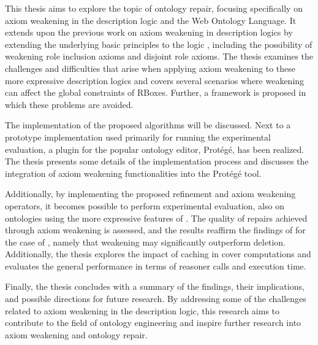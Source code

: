 This thesis aims to explore the topic of ontology repair, focusing specifically on axiom weakening in the \SROIQ description logic and the Web Ontology Language. It extends upon the previous work on axiom weakening in description logics by extending the underlying basic principles to the logic \SROIQ, including the possibility of weakening role inclusion axioms and disjoint role axioms. The thesis examines the challenges and difficulties that arise when applying axiom weakening to these more expressive description logics and covers several scenarios where weakening can affect the global constraints of \SROIQ RBoxes. Further, a framework is proposed in which these problems are avoided.

The implementation of the proposed algorithms will be discussed. Next to a prototype implementation used primarily for running the experimental evaluation, a plugin for the popular ontology editor, Protégé, has been realized. The thesis presents some details of the implementation process and discusses the integration of axiom weakening functionalities into the Protégé tool.

Additionally, by implementing the proposed refinement and axiom weakening operators, it becomes possible to perform experimental evaluation, also on ontologies using the more expressive features of \SROIQ. The quality of repairs achieved through axiom weakening is assessed, and the results reaffirm the findings of \cite{troquard2018repairing} for the case of \SROIQ, namely that weakening may significantly outperform deletion. Additionally, the thesis explores the impact of caching in cover computations and evaluates the general performance in terms of reasoner calls and execution time.

Finally, the thesis concludes with a summary of the findings, their implications, and possible directions for future research. By addressing some of the challenges related to axiom weakening in the \SROIQ description logic, this research aims to contribute to the field of ontology engineering and inspire further research into axiom weakening and ontology repair.

